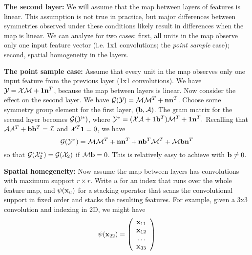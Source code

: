 \documentclass[runningheads]{llncs}
\newcommand{\vect}[1]{{\bf {#1}}}
\newcommand{\matx}[1]{{\cal {#1}}}
\begin{document}
{\bf The second layer:}   We will assume that the map between layers
of features is linear.  This assumption is not true in practice, but major
differences between symmetries observed under these conditions likely
result in differences when the map is linear.  We can analyze for two
cases: first, all units in the map observe only one input feature
vector (i.e. 1x1 convolutions; the {\em point sample} case); second, spatial homogeneity in the
layers.

{\bf The point sample case:} Assume that every unit in the map
observes only one input feature from the previous layer (1x1
convolutions).   We have $\matx{Y}=\matx{X}\matx{M}+\vect{1}\vect{n}^T$, because the map 
between layers is linear. Now consider the effect on the second layer.
We have ${\cal G}(\matx{Y})=\matx{M}\matx{M}^T+\vect{n}\vect{n}^T$.
Choose some symmetry group element for the first layer,
$\left(\vect{b}, \matx{A}\right)$.  The gram matrix for the second
layer becomes ${\cal G}(\matx{Y}^*)$, where
$\matx{Y}^*=(\matx{X} \matx{A}+\vect{1}\vect{b}^T)\matx{M}^T+\vect{1}\vect{n}^T.$
Recalling that $\matx{A}\matx{A}^T+\vect{b}\vect{b}^T=\matx{I}$ and
$\matx{X}^T\vect{1}=0$, we have 
\[
{\cal
  G}(\matx{Y}^*)=\matx{M}\matx{M}^T+\vect{n}\vect{n}^T+\vect{n}\vect{b}^T\matx{M}^T+\matx{M}\vect{b}\vect{n}^T
\]
so that ${\cal G}(\matx{X}_2^*)={\cal G}(\matx{X}_2)$ if
$\matx{M}\vect{b}=0$.  This is relatively easy to achieve with
$\vect{b}\neq 0$.

{\bf Spatial homegeneity:} Now assume the map between layers has
convolutions with maximum support $r \times r$.  Write $u$ for an
index that runs over the whole feature map, and $\psi(\vect{x}_u)$ for
a stacking operator that scans the convolutional support in fixed
order and stacks the resulting features. For example, given a 3x3
convolution and indexing in 2D, we might have
\[
\psi(\vect{x}_{22})=\left(\begin{array}{c}\vect{x}_{11}\\
\vect{x}_{12}\\
\ldots\\
\vect{x}_{33}
\end{array}\right)
\]
\end{document}
